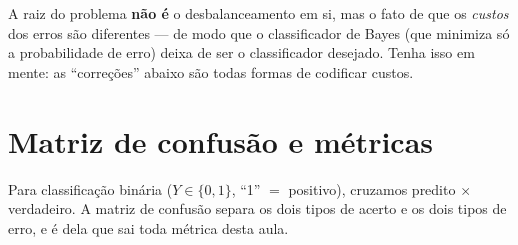 \documentclass[11pt,a4paper]{article}
\begin{document}
\begin{atencao}
A raiz do problema \textbf{não é} o desbalanceamento em si, mas o fato de que os
\emph{custos} dos erros são diferentes --- de modo que o classificador de Bayes
(que minimiza só a probabilidade de erro) deixa de ser o classificador desejado.
Tenha isso em mente: as ``correções'' abaixo são todas formas de codificar custos.
\end{atencao}

\section{Matriz de confusão e métricas}
Para classificação binária ($Y\in\{0,1\}$, ``1'' $=$ positivo), cruzamos predito
$\times$ verdadeiro. A matriz de confusão separa os dois tipos de acerto e os dois
tipos de erro, e é dela que sai toda métrica desta aula.
\end{document}
